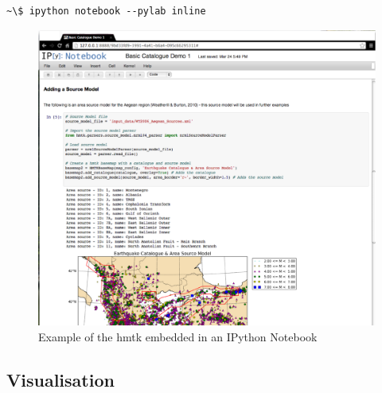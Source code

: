 \begin{Verbatim}[frame=single, commandchars=\\\{\}, fontsize=\scriptsize]
~\$ ipython notebook --pylab inline
\end{Verbatim}

\begin{figure}[htb]
  \centering
      \includegraphics[width=\textwidth]{./figures/hmtk_notebook_screenshot.eps}
  \caption{Example of the hmtk embedded in an IPython Notebook}
  \label{fig:notebook}
\end{figure}


%
%

\subsection{Visualisation}

